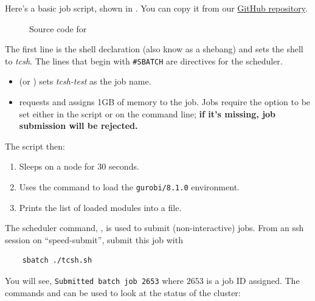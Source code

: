Here's a basic job script,  shown in .
You can copy it from our \href{https://github.com/NAG-DevOps/speed-hpc}{GitHub repository}.

\begin{figure}[htpb]
	
	\caption{Source code for }
	\label{fig:tcsh.sh}
\end{figure}

\noindent
The first line is the shell declaration (also know as a shebang) and sets the shell to \emph{tcsh}.
The lines that begin with \texttt{\#SBATCH} are directives for the scheduler.
\begin{itemize}
	\item {} (or ) sets \emph{tcsh-test} as the job name.
	\item {} requests and assigns 1GB of memory to the job. 
	Jobs require the  option to be set either in the script
	or on the command line; \textbf{if it's missing, job submission will be rejected.}
\end{itemize}

\noindent The script then:
\begin{enumerate}
	\item Sleeps on a node for 30 seconds.
	\item Uses the  command to load the \texttt{gurobi/8.1.0} environment.
	\item Prints the list of loaded modules into a file.
\end{enumerate}

\noindent
The scheduler command, , is used to submit (non-interactive) jobs. 
From an ssh session on ``speed-submit'', submit this job with
\begin{verbatim}
    sbatch ./tcsh.sh
\end{verbatim}

\noindent
You will see, \texttt{Submitted batch job 2653} where $2653$ is a job ID assigned.
The commands  and  can be used 
to look at the status of the cluster:


